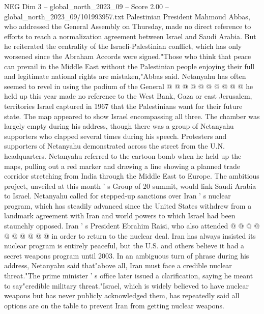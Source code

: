 \begin{textsample}{NEG Dim 3 – global\_north\_2023\_09 – Score 2.00 – global\_north\_2023\_09/101993957.txt}
Palestinian President Mahmoud Abbas, who addressed the General Assembly on Thursday, made no direct reference to efforts to reach a normalization agreement between Israel and Saudi Arabia.
But he reiterated the centrality of the Israeli-Palestinian conflict, which has only worsened since the Abraham Accords were signed."Those who think that peace can prevail in the Middle East without the Palestinian people enjoying their full and legitimate national rights are mistaken,"Abbas said.
Netanyahu has often seemed to revel in using the podium of the General @ @ @ @ @ @ @ @ @ @ he held up this year made no reference to the West Bank, Gaza or east Jerusalem, territories Israel captured in 1967 that the Palestinians want for their future state.
The map appeared to show Israel encompassing all three.
The chamber was largely empty during his address, though there was a group of Netanyahu supporters who clapped several times during his speech.
Protesters and supporters of Netanyahu demonstrated across the street from the U.N. headquarters.
Netanyahu referred to the cartoon bomb when he held up the maps, pulling out a red marker and drawing a line showing a planned trade corridor stretching from India through the Middle East to Europe.
The ambitious project, unveiled at this month ' s Group of 20 summit, would link Saudi Arabia to Israel.
Netanyahu called for stepped-up sanctions over Iran ' s nuclear program, which has steadily advanced since the United States withdrew from a landmark agreement with Iran and world powers to which Israel had been staunchly opposed.
Iran ' s President Ebrahim Raisi, who also attended @ @ @ @ @ @ @ @ @ @ in order to return to the nuclear deal.
Iran has always insisted its nuclear program is entirely peaceful, but the U.S. and others believe it had a secret weapons program until 2003.
In an ambiguous turn of phrase during his address, Netanyahu said that"above all, Iran must face a credible nuclear threat."The prime minister ' s office later issued a clarification, saying he meant to say"credible military threat."Israel, which is widely believed to have nuclear weapons but has never publicly acknowledged them, has repeatedly said all options are on the table to prevent Iran from getting nuclear weapons.

\end{textsample}
